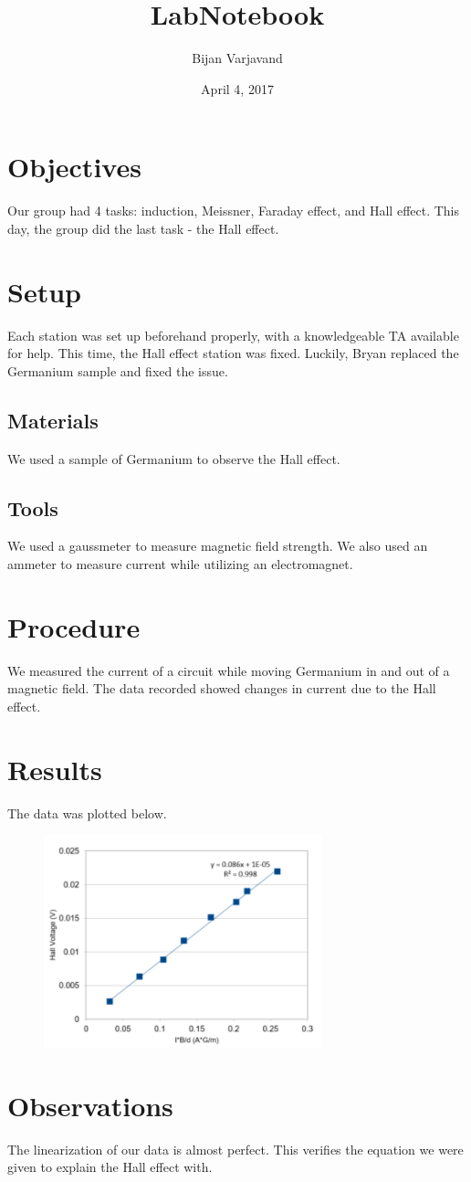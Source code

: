 \documentclass{article}
\author{Bijan Varjavand}
\title{LabNotebook}
\date{April 4, 2017}
\begin{document}
\maketitle

\section{Objectives}

Our group had 4 tasks: induction, Meissner, Faraday effect, and Hall effect. This day, the group did the last task - the Hall effect.

\section{Setup}

Each station was set up beforehand properly, with a knowledgeable TA available for help. This time, the Hall effect station was fixed. Luckily, Bryan replaced the Germanium sample and fixed the issue.

\subsection{Materials}

We used a sample of Germanium to observe the Hall effect.

\subsection{Tools}

We used a gaussmeter to measure magnetic field strength. We also used an ammeter to measure current while utilizing an electromagnet.

\section{Procedure}

We measured the current of a circuit while moving Germanium in and out of a magnetic field. The data recorded showed changes in current due to the Hall effect.

\section{Results}

The data was plotted below.

\begin{figure}[h!]
\centering
\includegraphics[scale=0.9]{hall.png}
\end{figure}

\section{Observations}

The linearization of our data is almost perfect. This verifies the equation we were given to explain the Hall effect with.
\end{document}
